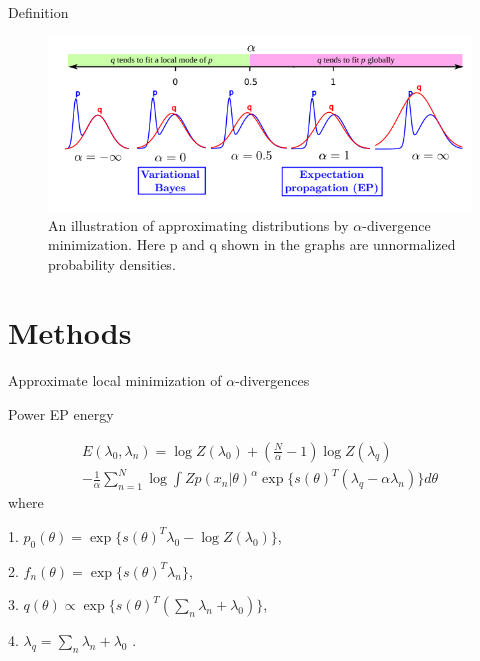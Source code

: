 \documentclass{beamer}
\begin{document}
\begin{frame}{Definition}
    
     \begin{figure}
        \centering
        \includegraphics[scale=0.7]{images/div_alpha.png}
        \caption{An illustration of approximating distributions by $\alpha$-divergence minimization. Here p and q shown in the graphs are unnormalized probability densities.}
        \label{fig:enter-label}
    \end{figure}
    
\end{frame}


\section{Methods}
\begin{frame}{Approximate local minimization of
$\alpha$-divergences}
\centering
\begin{block}{Power EP energy}

\begin{equation}
\begin{split}
    E(\lambda_0, {\lambda_n}) = \log Z(\lambda_0) + \left(\frac{N}{\alpha} - 1\right) \log Z(\lambda_q) 
    \\- \frac{1}{\alpha} \sum_{n=1}^N \log \int Z p(x_n|\theta)^{\alpha} \exp\{s(\theta)^T (\lambda_q - \alpha \lambda_n)\} d\theta
\end{split}
\end{equation}
where 

1. $p_0(\theta) = \exp\{s(\theta)^T \lambda_0 - \log Z(\lambda_0)\} $,

2. $f_n(\theta) = \exp\{s(\theta)^T \lambda_n\}$, 

3. $q(\theta) \propto \exp\{s(\theta)^T (\sum_{n}\lambda_n + \lambda_0)\}$, 

4. $\lambda_q = \sum_n \lambda_n + \lambda_0$ .
    \end{block}
 
\end{frame}
\end{document}
